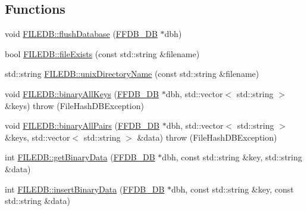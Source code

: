 \subsection*{Functions}
\begin{DoxyCompactItemize}
\item 
void \mbox{\hyperlink{namespaceFILEDB_a28e01191edebd63edee882e8c7af9325}{F\+I\+L\+E\+D\+B\+::flush\+Database}} (\mbox{\hyperlink{adat-devel_2other__libs_2filedb_2filehash_2ffdb__db_8h_a0b27b956926453a7a8141ea8e10f0df8}{F\+F\+D\+B\+\_\+\+DB}} $\ast$dbh)
\item 
bool \mbox{\hyperlink{namespaceFILEDB_ae588550e41a7b104b78a0e81ceb24a46}{F\+I\+L\+E\+D\+B\+::file\+Exists}} (const std\+::string \&filename)
\item 
std\+::string \mbox{\hyperlink{namespaceFILEDB_a7e76510d94991fb0a4e18acc02214900}{F\+I\+L\+E\+D\+B\+::unix\+Directory\+Name}} (const std\+::string \&filename)
\item 
void \mbox{\hyperlink{namespaceFILEDB_a208d694e308a85bd3b04277ffe369377}{F\+I\+L\+E\+D\+B\+::binary\+All\+Keys}} (\mbox{\hyperlink{adat-devel_2other__libs_2filedb_2filehash_2ffdb__db_8h_a0b27b956926453a7a8141ea8e10f0df8}{F\+F\+D\+B\+\_\+\+DB}} $\ast$dbh, std\+::vector$<$ std\+::string $>$ \&keys)  throw (\+File\+Hash\+D\+B\+Exception)
\item 
void \mbox{\hyperlink{namespaceFILEDB_ac242fd8f47258576482a692de8d1eaf3}{F\+I\+L\+E\+D\+B\+::binary\+All\+Pairs}} (\mbox{\hyperlink{adat-devel_2other__libs_2filedb_2filehash_2ffdb__db_8h_a0b27b956926453a7a8141ea8e10f0df8}{F\+F\+D\+B\+\_\+\+DB}} $\ast$dbh, std\+::vector$<$ std\+::string $>$ \&keys, std\+::vector$<$ std\+::string $>$ \&data)  throw (\+File\+Hash\+D\+B\+Exception)
\item 
int \mbox{\hyperlink{namespaceFILEDB_a0de8699301294566d0e11786f4016a2a}{F\+I\+L\+E\+D\+B\+::get\+Binary\+Data}} (\mbox{\hyperlink{adat-devel_2other__libs_2filedb_2filehash_2ffdb__db_8h_a0b27b956926453a7a8141ea8e10f0df8}{F\+F\+D\+B\+\_\+\+DB}} $\ast$dbh, const std\+::string \&key, std\+::string \&data)
\item 
int \mbox{\hyperlink{namespaceFILEDB_a517749615adc5aa798175fb429115366}{F\+I\+L\+E\+D\+B\+::insert\+Binary\+Data}} (\mbox{\hyperlink{adat-devel_2other__libs_2filedb_2filehash_2ffdb__db_8h_a0b27b956926453a7a8141ea8e10f0df8}{F\+F\+D\+B\+\_\+\+DB}} $\ast$dbh, const std\+::string \&key, const std\+::string \&data)
\end{DoxyCompactItemize}
